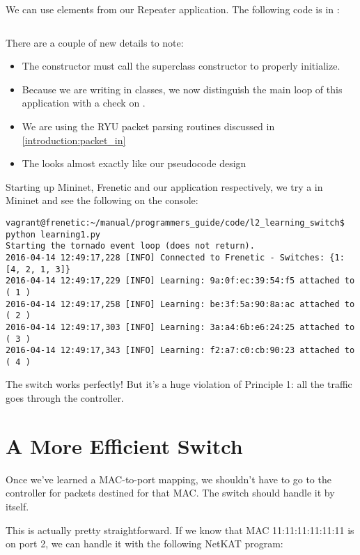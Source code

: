 We can use elements from our Repeater application.
The following code is in :

\inputminted[linenos]{python}{code/l2_learning_switch/learning1.py}

There are a couple of new details to note:

\begin{itemize}
\item The  constructor must call the superclass constructor to properly initialize.
\item Because we are writing in classes, we now distinguish the main loop of this application with 
a check on .  
\item We are using the RYU packet parsing routines discussed in \ref{introduction:packet_in}
\item The  looks almost exactly like our pseudocode design
\end{itemize}

Starting up Mininet, Frenetic and our application respectively, we try a  in Mininet and see
the following on the console:

\begin{verbatim}
vagrant@frenetic:~/manual/programmers_guide/code/l2_learning_switch$ python learning1.py
Starting the tornado event loop (does not return).
2016-04-14 12:49:17,228 [INFO] Connected to Frenetic - Switches: {1: [4, 2, 1, 3]}
2016-04-14 12:49:17,229 [INFO] Learning: 9a:0f:ec:39:54:f5 attached to ( 1 )
2016-04-14 12:49:17,258 [INFO] Learning: be:3f:5a:90:8a:ac attached to ( 2 )
2016-04-14 12:49:17,303 [INFO] Learning: 3a:a4:6b:e6:24:25 attached to ( 3 )
2016-04-14 12:49:17,343 [INFO] Learning: f2:a7:c0:cb:90:23 attached to ( 4 )
\end{verbatim}

The switch works perfectly!  But it's a huge violation of Principle 1: all the traffic 
goes through the controller.  

\section{A More Efficient Switch}

Once we've learned a MAC-to-port
mapping, we shouldn't have to go to the controller for packets destined for that MAC.  The switch
should handle it by itself.

This is actually pretty straightforward.  If we know that MAC 11:11:11:11:11:11 is on port 2, we
can handle it with the following NetKAT program:

